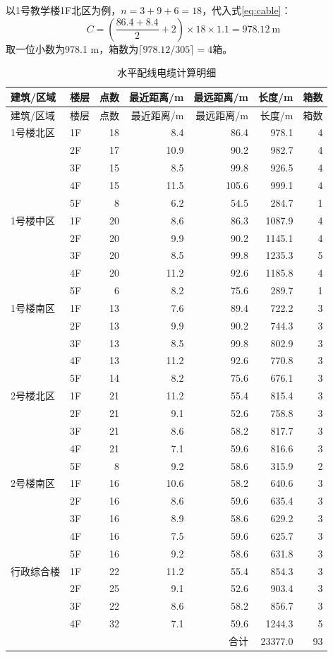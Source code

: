 \documentclass[UTF8,zihao=-4,openany]{ctexrep}
\begin{document}
以1号教学楼1F北区为例，$n=3+9+6=18$，代入式\eqref{eq:cable}：
\begin{equation}
C=\left(\frac{86.4+8.4}{2}+2\right)\times18\times1.1
=978.12\ \mathrm{m}
\end{equation}
取一位小数为978.1 m，箱数为$\lceil978.12/305\rceil=4$箱。

\begin{longtable}{llrrrrr}
\caption{水平配线电缆计算明细}\\
\toprule
建筑/区域&楼层&点数&最近距离/m&最远距离/m&长度/m&箱数\\
\midrule
\endfirsthead
\toprule
建筑/区域&楼层&点数&最近距离/m&最远距离/m&长度/m&箱数\\
\midrule
\endhead
1号楼北区&1F&18&8.4&86.4&978.1&4\\
&2F&17&10.9&90.2&982.7&4\\
&3F&15&8.5&99.8&926.5&4\\
&4F&15&11.5&105.6&999.1&4\\
&5F&8&6.2&54.5&284.7&1\\
1号楼中区&1F&20&8.6&86.3&1087.9&4\\
&2F&20&9.9&90.2&1145.1&4\\
&3F&20&8.5&99.8&1235.3&5\\
&4F&20&11.2&92.6&1185.8&4\\
&5F&6&8.2&75.6&289.7&1\\
1号楼南区&1F&13&7.6&89.4&722.2&3\\
&2F&13&9.9&90.2&744.3&3\\
&3F&13&8.5&99.8&802.9&3\\
&4F&13&11.2&92.6&770.8&3\\
&5F&14&8.2&75.6&676.1&3\\
2号楼北区&1F&21&11.2&55.4&815.4&3\\
&2F&21&9.1&52.6&758.8&3\\
&3F&21&8.6&58.2&817.7&3\\
&4F&21&7.1&59.6&816.6&3\\
&5F&8&9.2&58.6&315.9&2\\
2号楼南区&1F&16&10.6&58.2&640.6&3\\
&2F&16&8.6&59.6&635.4&3\\
&3F&16&8.9&58.6&629.2&3\\
&4F&16&7.5&59.6&625.7&3\\
&5F&16&9.2&58.6&631.8&3\\
行政综合楼&1F&22&11.2&55.4&854.3&3\\
&2F&25&9.1&52.6&903.4&3\\
&3F&22&8.6&58.2&856.7&3\\
&4F&32&7.1&59.6&1244.3&5\\
\midrule
\multicolumn{5}{r}{合计}&23377.0&93\\
\bottomrule
\end{longtable}
\end{document}
